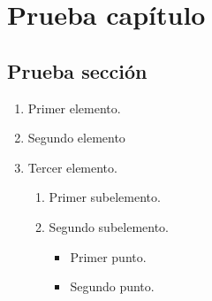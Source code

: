 \chapter{Prueba capítulo}\label{cap:cap2}

\section{Prueba sección}\label{sec:sec2.1}

\begin{enumerate}[label=\bfseries\headlinecolor\arabic*.]
    \item Primer elemento.
    \item Segundo elemento
    \item Tercer elemento.
    \begin{enumerate}[label=\alph*)]
        \item Primer subelemento.
        \item Segundo subelemento.
        \begin{itemize}[label=$\bullet$]
            \item Primer punto.
            \item Segundo punto.
        \end{itemize}
    \end{enumerate}
\end{enumerate}
